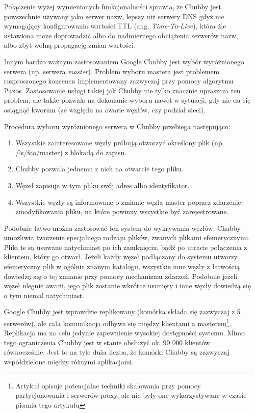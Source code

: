Połączenie wyżej wymienionych funkcjonalności sprawia, że Chubby jest powszechnie używany jako serwer nazw, lepszy niż serwery DNS gdyż nie wymagający konfigurowania wartości TTL (ang. \emph{Time-To-Live}), która źle ustawiona może doprowadzić albo do nadmiernego obciążenia serwerów nazw, albo zbyt wolną propagację zmian wartości.

Innym bardzo ważnym zastosowaniem Google Chubby jest wybór wyróżnionego serwera (np. serwera \emph{master}).
Problem wyboru mastera jest problemem rozproszonego konsensu implementowany zazwyczaj przy pomocy algorytmu Paxos.
Zastosowanie usługi takiej jak Chubby nie tylko znacznie upraszcza ten problem, ale także pozwala na dokonanie wyboru nawet w sytuacji, gdy nie da się osiągnąć kworum (ze względu na awarie węzłów, czy podział sieci).

Procedura wyboru wyróżnionego serwera w Chubby przebiega następująco:

\begin{enumerate}
 \item Wszystkie zainteresowane węzły próbują otworzyć określony plik (np. /ls/foo/master) z blokadą do zapisu.
 \item Chubby pozwala jednemu z nich na otwarcie tego pliku.
 \item Węzeł zapisuje w tym pliku swój adres albo identyfikator.
 \item Wszystkie węzły są informowane o zmianie węzła master poprzez zdarzenie zmodyfikowania pliku, na które powinny wszystkie być zarejestrowane.
\end{enumerate}

Podobnie łatwo można zastosować ten system do wykrywania węzłów.
Chubby umożliwia tworzenie specjalnego rodzaju plików, zwanych plikami efemerycznymi.
Pliki te są usuwane natychmiast po ich zamknięciu, bądź po utracie połączenia z klientem, który go otwarł.
Jeżeli każdy węzeł podłączany do systemu utworzy efemeryczny plik w ogólnie znanym katalogu, wszystkie inne węzły z łatwością dowiedzą się o tej zmianie przy pomocy mechanizmu zdarzeń.
Podobnie jeżeli węzeł ulegnie awarii, jego plik zostanie wkrótce usunięty i inne węzły dowiedzą się o tym niemal natychmiast.

Google Chubby jest wprawdzie replikowany (komórka składa się zazwyczaj z 5 serwerów), ale cała komunikacja odbywa się między klientami a masterem\footnote{Artykuł \cite{google-chubby} opisuje potencjalne techniki skalowania przy pomocy partycjonowania i serwerów proxy, ale nie były one wykorzystywane w czasie pisania tego artykułu}.
Replikacja ma na celu jedynie zapewnienie wysokiej dostępności systemu.
Mimo tego ograniczenia Chubby jest w stanie obsłużyć ok. 90 000 klientów równocześnie.
Jest to na tyle duża liczba, że komórki Chubby są zazwyczaj współdzielone między różnymi aplikacjami.

